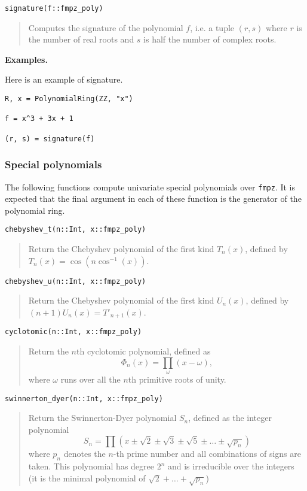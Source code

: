 \documentclass[a4paper,10pt]{article}
\newcommand{\code}{\lstinline}
\newcommand{\desc}[1]{\vspace{-3mm}\begin{quote}#1\end{quote}}
\begin{document}
{{\begin{lstlisting}
signature(f::fmpz_poly)
\end{lstlisting}

\desc{Computes the signature of the polynomial $f$, i.e. a tuple $(r, s)$ where $r$ is
the number of real roots and $s$ is half the number of complex roots.}

\textbf{Examples.}

Here is an example of signature.

\begin{lstlisting}
R, x = PolynomialRing(ZZ, "x")

f = x^3 + 3x + 1

(r, s) = signature(f)
\end{lstlisting}

\subsubsection{Special polynomials}

The following functions compute univariate special polynomials over \code{fmpz}. It is expected
that the final argument in each of these function is the generator of the polynomial ring.

\begin{lstlisting}
chebyshev_t(n::Int, x::fmpz_poly)
\end{lstlisting}

\desc{Return the Chebyshev polynomial of the first kind $T_n(x)$, defined by 
$T_n(x) = \cos(n \cos^{-1}(x))$.}

\begin{lstlisting}
chebyshev_u(n::Int, x::fmpz_poly)
\end{lstlisting}

\desc{Return the Chebyshev polynomial of the first kind $U_n(x)$, defined by 
$(n+1) U_n(x) = T'_{n+1}(x)$.}

\begin{lstlisting}
cyclotomic(n::Int, x::fmpz_poly)
\end{lstlisting}

\desc{Return the $n$th cyclotomic polynomial, defined as
$$\Phi_n(x) = \prod_{\omega} (x-\omega),$$ where $\omega$ runs over all the 
$n$th primitive roots of unity.}

\begin{lstlisting}
swinnerton_dyer(n::Int, x::fmpz_poly)
\end{lstlisting}

\desc{Return the Swinnerton-Dyer polynomial $S_n$, defined as the integer 
polynomial $$S_n = \prod (x \pm \sqrt{2} \pm \sqrt{3}
\pm \sqrt{5} \pm \ldots \pm \sqrt{p_n})$$ where $p_n$ denotes the $n$-th prime 
number and all combinations of signs are taken. This polynomial has degree $2^n$
and is irreducible over the integers (it is the minimal polynomial of 
$\sqrt{2} + \ldots + \sqrt{p_n}$)}

}}
\end{document}
